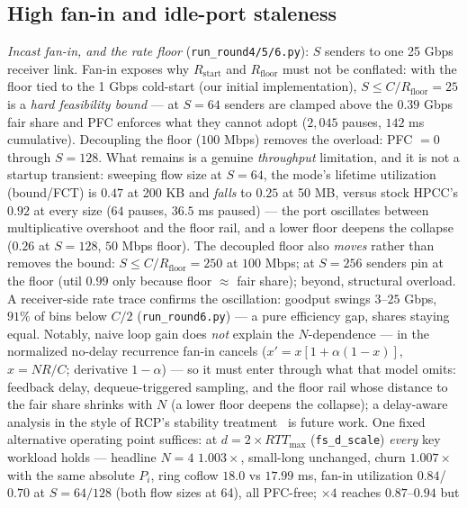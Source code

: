 \documentclass[sigconf, nonacm]{acmart}
\begin{document}
\subsection{High fan-in and idle-port staleness}
\label{sec:fanin}

\emph{Incast fan-in, and the rate floor} (\texttt{run\_round4/5/6.py}): $S$ senders to
one 25 Gbps receiver link. Fan-in
exposes why $R_{\mathrm{start}}$ and $R_{\mathrm{floor}}$ must not be conflated: with the
floor tied to the 1 Gbps cold-start (our initial implementation), $S \le C/R_{\mathrm{floor}}
= 25$ is a \emph{hard feasibility bound} --- at $S{=}64$ senders are clamped above the
$0.39$ Gbps fair share and PFC enforces what they cannot adopt ($2{,}045$
pauses, $142$ ms cumulative). Decoupling the floor ($100$ Mbps) removes the overload: PFC $=0$
through $S{=}128$. What remains is a genuine \emph{throughput} limitation, and it is not a
startup transient: sweeping flow size at $S{=}64$, the mode's lifetime utilization (bound/FCT) is $0.47$ at
200 KB and \emph{falls} to $0.25$ at 50 MB, versus stock HPCC's $0.92$ at every size ($64$
pauses, $36.5$ ms paused) --- the port oscillates between multiplicative overshoot and the
floor rail, and a lower floor deepens the collapse ($0.26$ at $S{=}128$, $50$ Mbps floor).
The decoupled floor also \emph{moves} rather than removes the bound: $S \le
C/R_{\mathrm{floor}} = 250$ at $100$ Mbps; at $S{=}256$ senders pin at the floor (util $0.99$
only because floor ${\approx}$ fair share); beyond, structural overload. A receiver-side rate trace confirms the oscillation: goodput swings $3$--$25$ Gbps, $91\%$
of bins below $C/2$ (\texttt{run\_round6.py}) --- a pure efficiency gap, shares staying
equal. Notably, naive loop gain does \emph{not} explain the $N$-dependence --- in the normalized
no-delay recurrence fan-in cancels ($x' = x[1+\alpha(1-x)]$, $x = NR/C$; derivative
$1-\alpha$) --- so it must enter through what that model omits: feedback delay,
dequeue-triggered sampling, and the floor rail whose distance to the fair share shrinks with
$N$ (a lower floor deepens the collapse); a delay-aware analysis in the style of RCP's
stability treatment~\cite{dukkipati2005processor} is future work.
One fixed alternative operating point suffices: at $d = 2 \times RTT_{\max}$
(\texttt{fs\_d\_scale}) \emph{every} key workload holds ---
headline $N{=}4$ $1.003\times$, small-long unchanged, churn $1.007\times$ with the same
absolute $P_i$, ring coflow $18.0$ vs $17.99$ ms, fan-in utilization $0.84$/$0.70$ at
$S{=}64/128$ (both flow sizes at 64), all PFC-free; $\times 4$ reaches $0.87$--$0.94$ but
\end{document}
